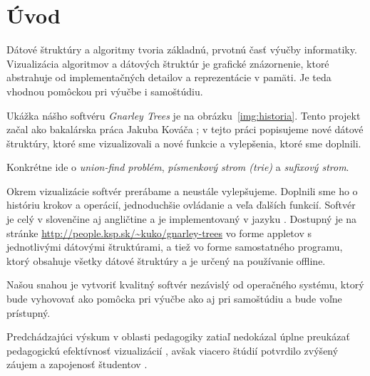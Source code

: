 \cleardoublepage
{}
\chapter*{Úvod}\label{chap:intro}

Dátové štruktúry a algoritmy tvoria základnú, prvotnú časť výučby 
informatiky. Vizualizácia algoritmov a dátových štruktúr je grafické 
znázornenie, ktoré abstrahuje od implementačných detailov a reprezentácie
v pamäti. Je teda vhodnou pomôckou pri výučbe i samoštúdiu. 

Ukážka nášho softvéru \emph{Gnarley Trees} je na obrázku~\ref{img:historia}.
Tento projekt začal ako bakalárska práca Jakuba Kováča \citep{kuko};
v tejto práci popisujeme nové dátové štruktúry, ktoré sme vizualizovali
a nové funkcie a vylepšenia, ktoré sme doplnili.

Konkrétne ide o \emph{union-find problém}, \emph{písmenkový strom (trie)} a 
\emph{sufixový strom}. 

Okrem vizualizácie softvér prerábame a neustále vylepšujeme.
Doplnili sme ho o históriu krokov a operácií, jednoduchšie ovládanie
a veľa ďalších funkcií. Softvér je celý v slovenčine aj angličtine a je 
implementovaný v jazyku \Java. Dostupný je na stránke
{\url{http://people.ksp.sk/~kuko/gnarley-trees}} vo forme appletov
s jednotlivými dátovými štruktúrami, a tiež vo forme samostatného programu,
ktorý obsahuje všetky dátové štruktúry a je určený na používanie offline.

Našou snahou je vytvoriť kvalitný softvér nezávislý od operačného systému, 
ktorý bude vyhovovať ako pomôcka pri výučbe ako aj pri samoštúdiu a bude
voľne prístupný. 

Predchádzajúci výskum v oblasti pedagogiky
zatiaľ nedokázal úplne preukázať pedagogickú efektívnosť
vizualizácií \citep{shaffer}, avšak viacero štúdií potvrdilo zvýšený záujem
a zapojenosť študentov \citep{naps02, hundhausen02}.

